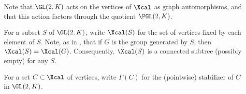 Note that $\GL(2,K)$ acts on the vertices of $\Xcal$ as graph automorphisms, and that this action factors through the quotient $\PGL(2,K)$.

For a subset $S$ of $\GL(2,K)$, write $\Xcal(S)$ for the set of vertices fixed by each element of $S$. Note, as in \cite[Sec. 3.1]{bellaicheSousgroupesGLArbres2014}, that if $G$ is the group generated by $S$, then $\Xcal(S) = \Xcal(G)$. Consequently, $\Xcal(S)$ is a connected subtree (possibly empty) for any $S$.

For  a set $C\subset \Xcal$ of vertices, write $\Gamma(C)$ for the (pointwise) stabilizer of $C$ in $\GL(2,K)$.


%

%
%



